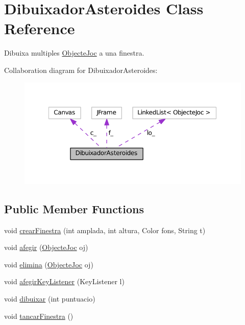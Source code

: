 \hypertarget{class_dibuixador_asteroides}{}\section{Dibuixador\+Asteroides Class Reference}
\label{class_dibuixador_asteroides}


Dibuixa multiples \hyperlink{interface_objecte_joc}{Objecte\+Joc} a una finestra.  




Collaboration diagram for Dibuixador\+Asteroides\+:\nopagebreak
\begin{figure}[H]
\begin{center}
\leavevmode
\includegraphics[width=350pt]{class_dibuixador_asteroides__coll__graph}
\end{center}
\end{figure}
\subsection*{Public Member Functions}
\begin{DoxyCompactItemize}
\item 
void \hyperlink{class_dibuixador_asteroides_a54a43290703d14aee21e5c87a5e6fc5b}{crear\+Finestra} (int amplada, int altura, Color fons, String t)
\item 
void \hyperlink{class_dibuixador_asteroides_ac70561df846258437f4145a41117e9ef}{afegir} (\hyperlink{interface_objecte_joc}{Objecte\+Joc} oj)
\item 
void \hyperlink{class_dibuixador_asteroides_a22269129b517ba0da55bc16e19e24b57}{elimina} (\hyperlink{interface_objecte_joc}{Objecte\+Joc} oj)
\item 
void \hyperlink{class_dibuixador_asteroides_a9add2702a95cbe7e68100c97a63b297f}{afegir\+Key\+Listener} (Key\+Listener l)
\item 
void \hyperlink{class_dibuixador_asteroides_af2138b89d2a5fe31697b2f206cbc2df4}{dibuixar} (int puntuacio)
\item 
void \hyperlink{class_dibuixador_asteroides_a14186d7acd8ca135252848f916416575}{tancar\+Finestra} ()
\end{DoxyCompactItemize}
